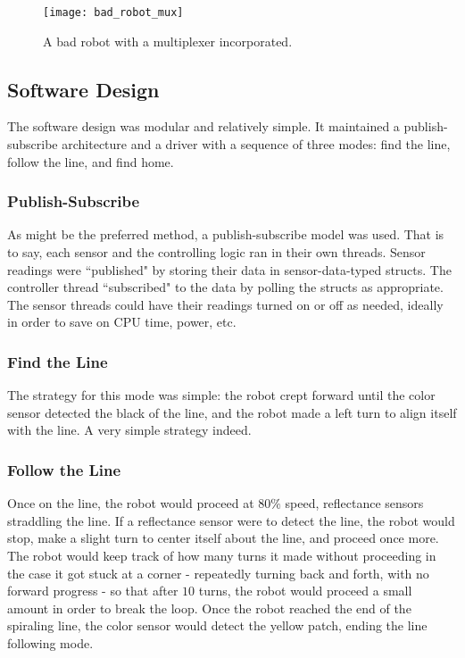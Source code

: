 \documentclass{article}
\begin{document}
    \begin{figure}[h]
    \centering
    \texttt{[image: bad\_robot\_mux]}
    \caption{A bad robot with a multiplexer incorporated.}
    \label{fig:bad_robot_mux}
    \end{figure}

\newpage
\subsection{Software Design}
The software design was modular and relatively simple. It maintained a publish-subscribe architecture and a driver with a sequence of three modes: find the line, follow the line, and find home.

\subsubsection{Publish-Subscribe}
As might be the preferred method, a publish-subscribe model was used. That is to say, each sensor and the controlling logic ran in their own threads. Sensor readings were ``published" by storing their data in sensor-data-typed structs. The controller thread ``subscribed" to the data by polling the structs as appropriate. The sensor threads could have their readings turned on or off as needed, ideally in order to save on CPU time, power, etc.

\subsubsection{Find the Line}
The strategy for this mode was simple: the robot crept forward until the color sensor detected the black of the line, and the robot made a left turn to align itself with the line. A very simple strategy indeed.

\subsubsection{Follow the Line}
Once on the line, the robot would proceed at $80\%$ speed, reflectance sensors straddling the line. If a reflectance sensor were to detect the line, the robot would stop, make a slight turn to center itself about the line, and proceed once more. The robot would keep track of how many turns it made without proceeding in the case it got stuck at a corner - repeatedly turning back and forth, with no forward progress - so that after $10$ turns, the robot would proceed a small amount in order to break the loop. Once the robot reached the end of the spiraling line, the color sensor would detect the yellow patch, ending the line following mode.
\end{document}
